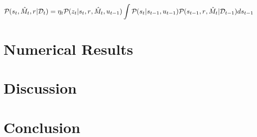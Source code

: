 \\
\begin{widetext}
\begin{align}
\mathcal{P}_{} ( s_{ t}, \hat{M}_t, r_{ } | \mathcal{D}_t )  = \eta_t\mathcal{P}_{} ( z_t | s_{ t}, r_{ }, \hat{M}_t, u_{t-1} ) \int \mathcal{P}_{} (  s_{ t}| s_{ t-1}, u_{t-1} ) \mathcal{P}_{} ( s_{ t-1}, r_{ }, \hat{M}_t| \mathcal{D}_{t-1} )  ds_{t-1}    \label{eqn:slam:12}
\end{align}
\end{widetext}


\section{Numerical Results} \label{sec:ohfuckresults}


\section{Discussion} \label{sec:discussion}


\section{Conclusion} \label{sec:conclusion}
































